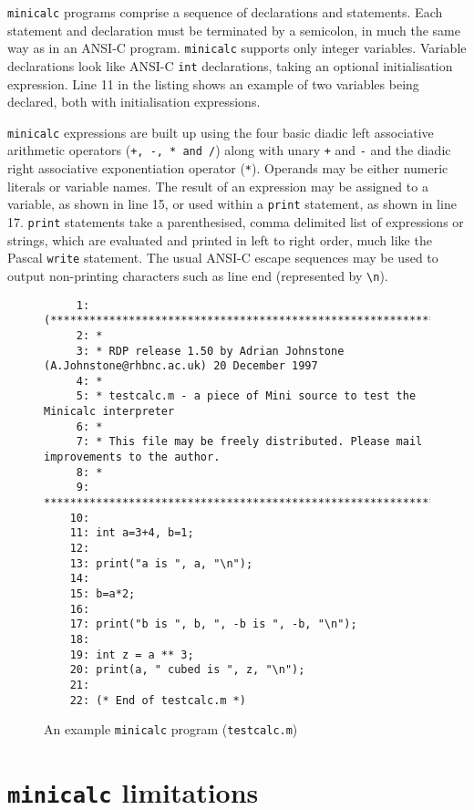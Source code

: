 {\tt minicalc} programs comprise a sequence of declarations and
statements. Each statement and declaration must be terminated by a
semicolon, in much the same way as in an ANSI-C program. {\tt minicalc}
supports only integer variables. Variable declarations look like ANSI-C
{\tt int} declarations, taking an optional initialisation expression.
Line 11 in the listing shows an example of two variables being declared,
both with initialisation expressions.

{\tt minicalc} expressions are built up using the four basic diadic left
associative arithmetic operators ({\tt +, -, * and /}) along with unary
{\tt +} and {\tt -} and  the diadic right associative exponentiation
operator ({\tt **}). Operands may be either numeric literals or
variable names. The result of an expression may be assigned to a
variable, as shown in line 15, or used within a {\tt print} statement,
as shown in line 17. {\tt print} statements take a parenthesised, comma
delimited list of expressions or strings, which are evaluated and
printed in left to right order, much like the Pascal {\tt write}
statement. The usual ANSI-C escape sequences may be used to output
non-printing characters such as line end (represented by \verb+\n+).

\begin{figure}
\hspace*{-1cm}
\begin{minipage}{30cm}
\footnotesize
\begin{verbatim}
     1: (*******************************************************************************
     2: *
     3: * RDP release 1.50 by Adrian Johnstone (A.Johnstone@rhbnc.ac.uk) 20 December 1997
     4: *
     5: * testcalc.m - a piece of Mini source to test the Minicalc interpreter
     6: *
     7: * This file may be freely distributed. Please mail improvements to the author.
     8: *
     9: *******************************************************************************)
    10: 
    11: int a=3+4, b=1;
    12: 
    13: print("a is ", a, "\n");
    14: 
    15: b=a*2;
    16: 
    17: print("b is ", b, ", -b is ", -b, "\n");
    18: 
    19: int z = a ** 3;
    20: print(a, " cubed is ", z, "\n");
    21: 
    22: (* End of testcalc.m *)
\end{verbatim}
\end{minipage}
\caption{An example {\tt minicalc} program ({\tt testcalc.m})}
\label{minicalc:program}
\end{figure}

\section{{\tt minicalc} limitations}

